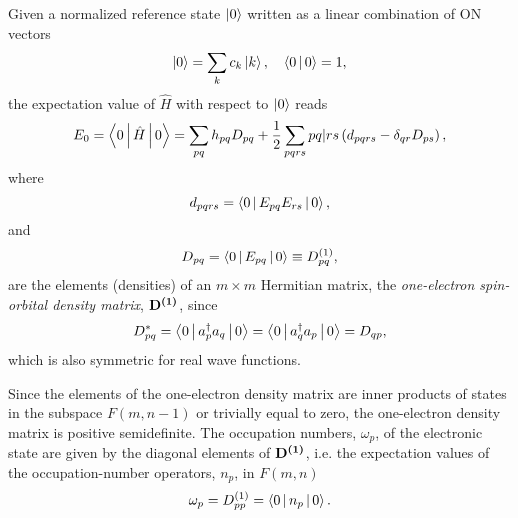 Given a normalized reference state
$\Ket{0}$ written as a linear combination of ON vectors 
\begin{equation}
    \Ket{0} = \sum_{k} c_k \Ket{k}
    , \quad
    \Braket{0 | 0} = 1
    ,
\end{equation}
the expectation value of $\hat{H}$ with respect to $\Ket{0}$ reads
\begin{equation} \label{eq:GS-energy-1}
    E_0 = \Braket{0 | \hat{H} | 0} =
    \sum_{pq} h_{pq} D_{pq} + \frac{1}{2} \sum_{pqrs}
    \PBraket{pq | rs} \left( d_{pqrs} - \delta_{qr} D_{ps} \right)
    ,
\end{equation}
where 
\begin{equation}
    d_{pqrs} = \Braket{0 | E_{pq} E_{rs} | 0}
    ,
\end{equation}
and
\begin{equation} \label{eq:oedm-spin-representation}
    D_{pq} = \Braket{0 | E_{pq} | 0} \equiv \oedm_{pq}
    ,
\end{equation}
are the elements (densities) of an $m \times m$ Hermitian matrix, the
\textit{one-electron spin-orbital density matrix}, $ \mat{\oedm}$, since 
\begin{equation}
    D_{pq}^{*} =
    \Braket{0 | a_p^{\dagger} a_q | 0} =
    \Braket{0 | a_q^{\dagger} a_p | 0} =
    D_{qp}
    ,
\end{equation}
which is also symmetric for real wave functions.

Since the elements of the one-electron density matrix are inner products of 
states in the subspace $F\left( m, n-1 \right)$ or trivially equal to zero, 
the one-electron density matrix is positive semidefinite.
The occupation numbers, $\omega_p$, of the electronic state are given by the
diagonal elements of $ \mat{\oedm}$, i.e. the expectation values of the 
occupation-number operators, $n_p$, in $F\left( m,n \right)$
\begin{equation}
    \omega_p = \oedm_{pp} = \Braket{0 | n_p | 0}
    .
\end{equation}

